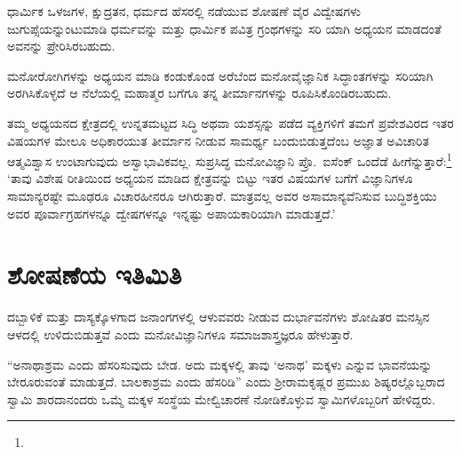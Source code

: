 ಧಾರ್ಮಿಕ ಒಳಜಗಳ, ಕ್ಷುದ್ರತನ, ಧರ್ಮದ ಹೆಸರಲ್ಲಿ ನಡೆಯುವ ಶೋಷಣೆ ವೈರ ವಿದ್ವೇಷಗಳು ಜುಗುಪ್ಸೆಯನ್ನುಂಟುಮಾಡಿ ಧರ್ಮವನ್ನು ಮತ್ತು ಧಾರ್ಮಿಕ ಪವಿತ್ರ ಗ್ರಂಥಗಳನ್ನು ಸರಿ ಯಾಗಿ ಅಧ್ಯಯನ ಮಾಡದಂತೆ ಅವನನ್ನು ಪ್ರೇರಿಸಿರಬಹುದು.

ಮನೋರೋಗಿಗಳನ್ನು ಅಧ್ಯಯನ ಮಾಡಿ ಕಂಡುಕೊಂಡ ಅರೆಬೆಂದ ಮನೋವೈಜ್ಞಾನಿಕ ಸಿದ್ಧಾಂತಗಳನ್ನು ಸರಿಯಾಗಿ ಅರಗಿಸಿಕೊಳ್ಳದೆ ಆ ನೆಲೆಯಲ್ಲಿ ಮಹಾತ್ಮರ ಬಗೆಗೂ ತನ್ನ ತೀರ್ಮಾನಗಳನ್ನು ರೂಪಿಸಿಕೊಂಡಿರಬಹುದು.

ತಮ್ಮ ಅಧ್ಯಯನದ ಕ್ಷೇತ್ರದಲ್ಲಿ ಉನ್ನತಮಟ್ಟದ ಸಿದ್ಧಿ ಅಥವಾ ಯಶಸ್ಸನ್ನು ಪಡೆದ ವ್ಯಕ್ತಿಗಳಿಗೆ ತಮಗೆ ಪ್ರವೇಶವಿರದ ಇತರ ವಿಷಯಗಳ ಮೇಲೂ ಅಧಿಕಾರಯುತ ತೀರ್ಮಾನ ನೀಡುವ ಸಾಮರ್ಥ್ಯ ಬಂದುಬಿಡುತ್ತದೆಂಬ ಅಜ್ಞಾತ ಅವಿಚಾರಿತ ಆತ್ಮವಿಶ್ವಾಸ ಉಂಟಾಗುವುದು ಅಸ್ವಾಭಾವಿಕವಲ್ಲ. ಸುಪ್ರಸಿದ್ಧ ಮನೋವಿಜ್ಞಾನಿ ಪ್ರೊ.\ ಐಸೆಂಕ್ ಒಂದೆಡೆ ಹೀಗೆನ್ನುತ್ತಾರೆ:\footnote{\hfill{}} ‘ತಾವು ವಿಶೇಷ ರೀತಿಯಿಂದ ಅಧ್ಯಯನ ಮಾಡಿದ ಕ್ಷೇತ್ರವನ್ನು ಬಿಟ್ಟು ಇತರ ವಿಷಯಗಳ ಬಗೆಗೆ ವಿಜ್ಞಾನಿಗಳೂ ಸಾಮಾನ್ಯರಷ್ಟೇ ಮೂಢರೂ ವಿಚಾರಹೀನರೂ ಆಗಿರುತ್ತಾರೆ. ಮಾತ್ರವಲ್ಲ ಅವರ ಅಸಾಮಾನ್ಯ\-ವೆನಿಸುವ ಬುದ್ಧಿಶಕ್ತಿಯು ಅವರ ಪೂರ್ವಾಗ್ರಹಗಳನ್ನೂ ದ್ವೇಷಗಳನ್ನೂ ಇನ್ನಷ್ಟು ಅಪಾಯಕಾರಿಯಾಗಿ ಮಾಡುತ್ತದೆ.’


\section*{ಶೋಷಣೆಯ ಇತಿಮಿತಿ}


ದಬ್ಬಾಳಿಕೆ ಮತ್ತು ದಾಸ್ಯಕ್ಕೊಳಗಾದ ಜನಾಂಗಗಳಲ್ಲಿ ಆಳುವವರು ನೀಡುವ ದುರ್ಭಾವನೆಗಳು ಶೋಷಿತರ ಮನಸ್ಸಿನ ಆಳದಲ್ಲಿ ಉಳಿದುಬಿಡುತ್ತವೆ ಎಂದು ಮನೋವಿಜ್ಞಾನಿಗಳೂ ಸಮಾಜ\break ಶಾಸ್ತ್ರಜ್ಞರೂ ಹೇಳುತ್ತಾರೆ.

“ಅನಾಥಾಶ್ರಮ ಎಂದು ಹೆಸರಿಸುವುದು ಬೇಡ. ಅದು ಮಕ್ಕಳಲ್ಲಿ ತಾವು ‘ಅನಾಥ’ ಮಕ್ಕಳು ಎನ್ನುವ ಭಾವನೆಯನ್ನು ಬೇರೂರುವಂತೆ ಮಾಡುತ್ತದೆ. ಬಾಲಕಾಶ್ರಮ ಎಂದು ಹೆಸರಿಡಿ” ಎಂದು ಶ‍್ರೀರಾಮಕೃಷ್ಣರ ಪ್ರಮುಖ ಶಿಷ್ಯರಲ್ಲೊಬ್ಬರಾದ ಸ್ವಾಮಿ ಶಾರದಾನಂದರು ಒಮ್ಮೆ ಮಕ್ಕಳ ಸಂಸ್ಥೆಯ ಮೇಲ್ವಿಚಾರಣೆ ನೋಡಿಕೊಳ್ಳುವ ಸ್ವಾಮಿಗಳೊಬ್ಬರಿಗೆ ಹೇಳಿದ್ದರು.

